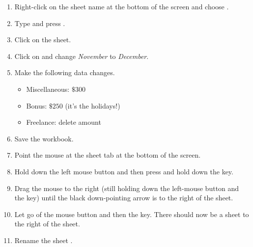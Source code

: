 \begin{enumerate}
	\item Right-click on the  sheet name at the bottom of the screen and choose .
	\item Type  and press .
	\item Click on the  sheet.
	\item Click on  and change \textit{November} to \textit{December}.
	\item Make the following data changes.

	\begin{itemize}
		\item Miscellaneous: $ \$300 $
		\item Bonus: $ \$250 $ (it's the holidays!)
		\item Freelance: delete amount
	\end{itemize}

	\item Save the workbook.
	\item Point the mouse at the  sheet tab at the bottom of the screen.
	\item Hold down the left mouse button and then press and hold down the  key.
	\item Drag the mouse to the right (still holding down the left-mouse button and the  key) until the black down-pointing arrow is to the right of the  sheet.
	\item Let go of the mouse button and then the  key. There should now be a  sheet to the right of the  sheet.
	\item Rename the  sheet .
\end{enumerate}

